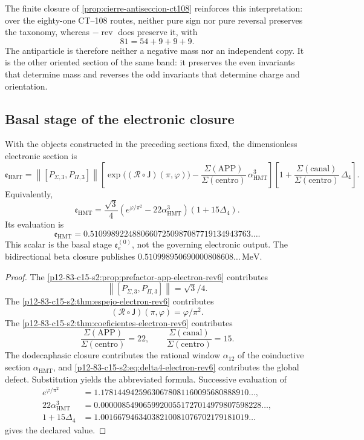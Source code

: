 The finite closure of \cref{prop:cierre-antiseccion-ct108} reinforces this
interpretation: over the eighty-one CT--108 routes, neither pure sign nor
pure reversal preserves the taxonomy, whereas
\(-\operatorname{rev}\) does preserve it, with
\[
 81=54+9+9+9.
\]
The antiparticle is therefore neither a negative mass nor an independent
copy. It is the other oriented section of the same band: it preserves the
even invariants that determine mass and reverses the odd invariants that
determine charge and orientation.

\subsection{Basal stage of the electronic closure}

\begin{theorem}
\label{p12-83-c15-s2:thm:cierre-electron-holografico-rev6}
With the objects constructed in the preceding sections fixed, the
dimensionless electronic section is
\[
 \mathfrak e_{\mathrm{HMT}}
 =
 \left\|[P_{\Sigma,3},P_{\Pi,3}]\right\|
 \left[
 \exp\bigl((\mathscr R\circ\mathsf J)(\pi,\varphi)\bigr)
 -\frac{\Sigma(\mathrm{APP})}
 {\Sigma(\mathrm{centro})}\,
 \alpha_{\mathrm{HMT}}^3
 \right]
 \left[
 1+
 \frac{\Sigma(\mathrm{canal})}
 {\Sigma(\mathrm{centro})}\,
 \Delta_4
 \right].
\]
Equivalently,
\[
 \boxed{
 \mathfrak e_{\mathrm{HMT}}
 =
 \frac{\sqrt3}{4}
 \left(e^{\varphi/\pi^2}
 -22\alpha_{\mathrm{HMT}}^3\right)
 (1+15\Delta_4).}
\]
Its evaluation is
\[
 \boxed{
 \mathfrak e_{\mathrm{HMT}}
 =
 0.51099892248806607250987087719134943763\ldots.}
\]
This scalar is the basal stage \(\mathfrak e_e^{(0)}\), not the governing
electronic output. The bidirectional beta closure publishes
\(0.510998950690000808608\ldots\,\mathrm{MeV}\).
\end{theorem}

\begin{proof}
The \cref{p12-83-c15-s2:prop:prefactor-app-electron-rev6} contributes
\[
 \left\|[P_{\Sigma,3},P_{\Pi,3}]\right\|=\sqrt3/4.
\]
The \cref{p12-83-c15-s2:thm:espejo-electron-rev6} contributes
\[
 (\mathscr R\circ\mathsf J)(\pi,\varphi)=\varphi/\pi^2.
\]
The \cref{p12-83-c15-s2:thm:coeficientes-electron-rev6} contributes
\[
 \frac{\Sigma(\mathrm{APP})}{\Sigma(\mathrm{centro})}=22,
 \qquad
 \frac{\Sigma(\mathrm{canal})}{\Sigma(\mathrm{centro})}=15.
\]
The dodecaphasic closure contributes the rational window \(\alpha_{12}\) of the
coinductive section \(\alpha_{\mathrm{HMT}}\), and
\cref{p12-83-c15-s2:eq:delta4-electron-rev6} contributes the global defect. Substitution
yields the abbreviated formula. Successive evaluation of
\[
\begin{aligned}
 e^{\varphi/\pi^2}
 &=1.17814494259630678081160095680888910\ldots,\\
 22\alpha_{\mathrm{HMT}}^3
 &=0.00000854906599200551727014979807598228\ldots,\\
 1+15\Delta_4
 &=1.00166794634038210081076702179181019\ldots
\end{aligned}
\]
gives the declared value.
\end{proof}

